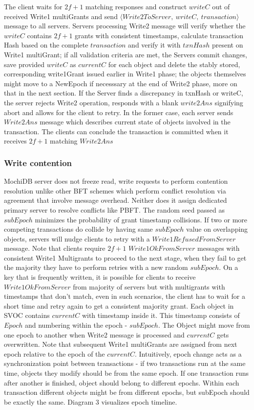 \documentclass[letterpaper,twocolumn,10pt]{article}
\begin{document}
The client waits for $2f+1$ matching responses and construct $writeC$ out of received Write1 multiGrants and send $\langle Write2ToServer,\ writeC,\ transaction \rangle$ message to all servers. Servers processing Write2 message will verify whether the $writeC$ contains $2f+1$ grants with consistent timestamps, calculate transaction Hash based on the complete $transaction$ and verify it with $txnHash$ present on Write1 multiGrant; if all validation criteria are met, the Servers commit changes, save provided $writeC$ as $currentC$ for each object and delete the stably stored, corresponding write1Grant issued earlier in Write1 phase; the objects themselves might move to a NewEpoch if necesssary at the end of Write2 phase, more on that in the next section. If the Server finds a discrepancy in txnHash or writeC, the server rejects Write2 operation, responds with a blank $write2Ans$ signifying abort and allows for the client to retry. In the former case, each server sends $Write2Ans$ message which describes current state of objects involved in the transaction. The clients can conclude the transaction is committed when it receives $2f+1$ matching $Write2Ans$

\subsubsection{Write contention} \label{write_contension}
MochiDB server does not freeze read, write requests to perform contention resolution unlike other BFT schemes which perform conflict resolution via agreement that involve message overhead\cite{HQ_replication}. Neither does it assign dedicated primary server to resolve conflicts like PBFT\cite{Practical_BFT}. The random seed passed as $subEpoch$ minimizes the probability of grant timestamp collisions. If two or more competing transactions do collide by having same $subEpoch$ value on overlapping objects, servers will nudge clients to retry with a $Write1RefusedFromServer$ message. Note that clients require $2f+1$ $Write1OkFromServer$ messages with consistent Write1 Multigrants to proceed to the next stage, when they fail to get the majority they have to perform retries with a new random $subEpoch$. On a key that is frequently written, it is possible for clients to receive $Write1OkFromServer$ from majority of servers but with multigrants with timestamps that don't match, even in such scenarios, the client has to wait for a short time and retry again to get a consistent majority grant. Each object in SVOC contains $currentC$ with timestamp inside it. This timestamp consists of $Epoch$ and numbering within the epoch - $subEpoch$. The Object might move from one epoch to another when Write2 message is processed and $currentC$ gets overwritten. Note that subsequent Write1 multiGrants are assigned from next epoch relative to the epoch of the $currentC$. Intuitively, epoch change acts as a synchronization point between transactions - if two transactions run at the same time, objects they modify should be from the same epoch. If one transaction runs after another is finished, object should belong to different epochs. Within each transaction different objects might be from different epochs, but subEpoch should be exactly the same. Diagram 3 visualizes epoch timeline. 
\end{document}
